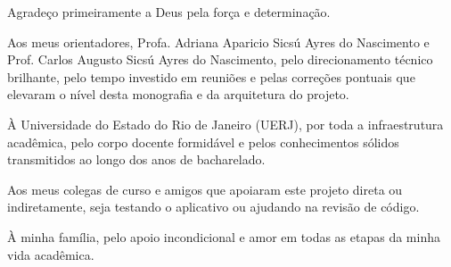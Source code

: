 \begin{agradecimentos}
Agradeço primeiramente a Deus pela força e determinação. 

Aos meus orientadores, Profa. Adriana Aparicio Sicsú Ayres do Nascimento e Prof. Carlos Augusto Sicsú Ayres do Nascimento, pelo direcionamento técnico brilhante, pelo tempo investido em reuniões e pelas correções pontuais que elevaram o nível desta monografia e da arquitetura do projeto.

À Universidade do Estado do Rio de Janeiro (UERJ), por toda a infraestrutura acadêmica, pelo corpo docente formidável e pelos conhecimentos sólidos transmitidos ao longo dos anos de bacharelado.

Aos meus colegas de curso e amigos que apoiaram este projeto direta ou indiretamente, seja testando o aplicativo ou ajudando na revisão de código.

À minha família, pelo apoio incondicional e amor em todas as etapas da minha vida acadêmica.
\end{agradecimentos}
